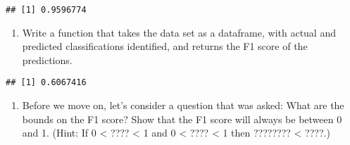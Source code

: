 \documentclass[]{article}
\newenvironment{Shaded}{\begin{snugshade}}{\end{snugshade}}
\newcommand{\KeywordTok}[1]{\textcolor[rgb]{0.13,0.29,0.53}{\textbf{#1}}}
\newcommand{\DecValTok}[1]{\textcolor[rgb]{0.00,0.00,0.81}{#1}}
\newcommand{\StringTok}[1]{\textcolor[rgb]{0.31,0.60,0.02}{#1}}
\newcommand{\ControlFlowTok}[1]{\textcolor[rgb]{0.13,0.29,0.53}{\textbf{#1}}}
\newcommand{\OperatorTok}[1]{\textcolor[rgb]{0.81,0.36,0.00}{\textbf{#1}}}
\newcommand{\NormalTok}[1]{#1}
\providecommand{\tightlist}{%
  \setlength{\itemsep}{0pt}\setlength{\parskip}{0pt}}
\begin{document}
\begin{verbatim}
## [1] 0.9596774
\end{verbatim}

\begin{enumerate}
\def\labelenumi{\arabic{enumi}.}
\setcounter{enumi}{7}
\tightlist
\item
  Write a function that takes the data set as a dataframe, with actual
  and predicted classifications identified, and returns the F1 score of
  the predictions.
\end{enumerate}

\begin{Shaded}
\end{Shaded}

\begin{verbatim}
## [1] 0.6067416
\end{verbatim}

\begin{enumerate}
\def\labelenumi{\arabic{enumi}.}
\setcounter{enumi}{8}
\tightlist
\item
  Before we move on, let's consider a question that was asked: What are
  the bounds on the F1 score? Show that the F1 score will always be
  between 0 and 1. (Hint: If 0 \textless{} ???? \textless{} 1 and 0
  \textless{} ???? \textless{} 1 then ???????? \textless{} ????.)
\end{enumerate}
\end{document}
